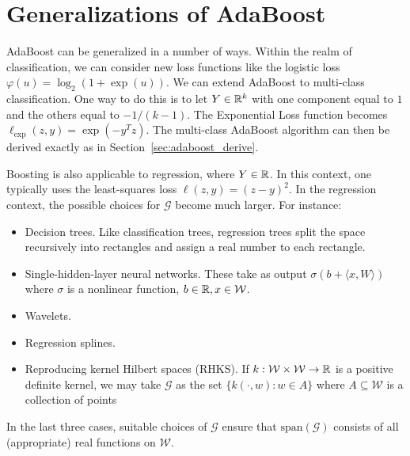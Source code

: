 \section{Generalizations of AdaBoost}
AdaBoost can be generalized in a number of ways. Within the realm of classification, we can consider new loss functions like the logistic loss $\varphi(u) = \log_2 (1+ \exp(u))$. We can extend AdaBoost to multi-class classification. One way to do this is to let $Y \in \mathbb{R}^k$ with one component equal to $1$ and the others equal to $-1/(k-1)$. The Exponential Loss function becomes $\ell_\text{exp}(z, y) = \exp(-y^T z)$. The multi-class AdaBoost algorithm can then be derived exactly as in Section~\ref{sec:adaboost_derive}.

Boosting is also applicable to regression, where $Y \in \mathbb{R}$. In this context, one typically uses the least-squares loss $\ell(z, y) = (z - y)^2$. In the regression context, the possible choices for $\mathcal{G}$ become much larger. For instance:
\begin{itemize}
	\item Decision trees. Like classification trees, regression trees split the space recursively into rectangles and assign a real number to each rectangle.
	\item Single-hidden-layer neural networks. These take as output $\sigma(b + \langle x, W \rangle )$ where $\sigma$ is a nonlinear function, $b \in \mathbb{R}, x \in \mathcal{W}$.
	\item Wavelets.
	\item Regression splines.
	\item Reproducing kernel Hilbert spaces (RHKS). If $k: \mathcal{W} \times \mathcal{W} \to \mathbb{R}$ is a positive definite kernel, we may take $\mathcal{G}$ as the set $\{k(\cdot, w): w \in A\}$ where $A \subseteq \mathcal{W}$ is a collection of points
\end{itemize}
In the last three cases, suitable choices of $\mathcal{G}$ ensure that $\text{span}(\mathcal{G})$ consists of all (appropriate) real functions on $\mathcal{W}$.

